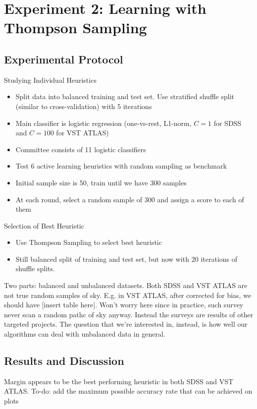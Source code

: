 

\chapter{Experiment 2: Learning with Thompson Sampling}
\label{cha:expt2}

\section{Experimental Protocol}
\label{sec:protocol2}

Studying Individual Heuristics
\begin{itemize}
	\item Split data into balanced training and test set. Use stratified shuffle split
	(similar to cross-validation) with 5 iterations
	\item Main classifier is logistic regression (one-vs-rest, L1-norm, $C=1$ for SDSS and $C=100$
	for VST ATLAS)
	\item Committee consists of 11 logistic classifiers
	\item Test 6 active learning heuristics with random sampling as benchmark
	\item Initial sample size is 50, train until we have 300 samples
	\item At each round, select a random sample of 300 and assign a score to each of them
\end{itemize}
Selection of Best Heuristic
\begin{itemize}
	\item Use Thompson Sampling to select best heuristic
	\item Still balanced split of training and test set, but now with 20 iterations of
	shuffle splits.
\end{itemize}

Two parts: balanced and unbalanced datasets. Both SDSS and VST ATLAS are not true
random samples of sky. E.g. in VST ATLAS, after corrected for bias, we should have [insert
table here]. Won't worry here since in practice, such survey never scan a random pathc
of sky anyway. Instead the surveys are results of other targeted projects.
The question that we're interested in, instead, is how well our algorithms can
deal with unbalanced data in general.


\section{Results and Discussion}
\label{sec:results2}
Margin appears to be the best performing heuristic in both SDSS and VST ATLAS.
To-do: add the maximum possible accuracy rate that can be achieved on plots

